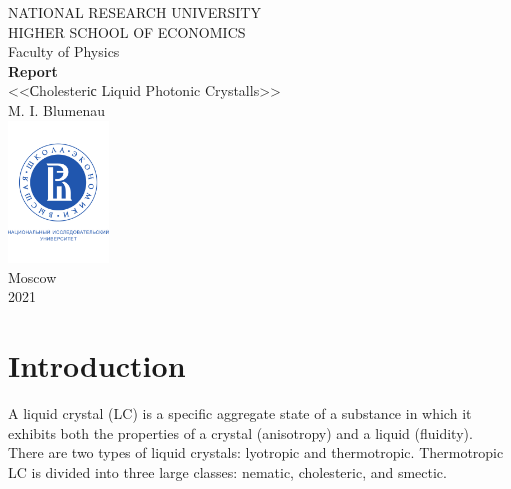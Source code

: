 \documentclass[a4paper, 12pt]{article}
\begin{document}
\begin{titlepage}
\begin{center}
$$$$
$$$$
$$$$
$$$$
{\Large{NATIONAL RESEARCH UNIVERSITY}}\\
\vspace{0.1cm}
{\Large{HIGHER SCHOOL OF ECONOMICS}}\\
\vspace{0.25cm}
{\large{Faculty of Physics}}\\
\vspace{5.5cm}
{\Huge\textbf{{Report}}}\\%
\vspace{1cm}
{\LARGE{<<Сholesteriс Liquid Photonic Crystalls>>}}\\%
\vspace{1cm}
{\large{M. I. Blumenau}}\\%
\vspace{2cm}
\vfill
\includegraphics[width = 0.2\textwidth]{HSElogo}\\
\vfill
Moscow\\
2021
\end{center}
\end{titlepage}

\tableofcontents
\newpage
{}
\section*{Introduction}
A liquid crystal (LC) is a specific aggregate state of a substance in which it exhibits both the properties of a crystal (anisotropy) and a liquid (fluidity). There are two types of liquid crystals:  lyotropic and thermotropic. Thermotropic LC is divided into three large classes: nematic, cholesteric, and smectic. 
\end{document}
